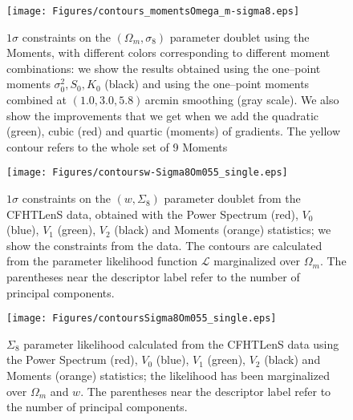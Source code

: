 \documentclass[reprint,aps,prd,superscriptaddress,showkeys,showpacs]{revtex4-1}
\begin{document}
\begin{figure}
\begin{center}
\texttt{[image: Figures/contours\_momentsOmega\_m-sigma8.eps]}
\end{center}
\caption{$1\sigma$ constraints on the $(\Omega_m,\sigma_8)$ parameter doublet using the Moments, with different colors corresponding to different moment combinations: we show the results obtained using the one--point moments $\sigma_0^2,S_0,K_0$ (black) and using the one--point moments combined at $(1.0,3.0,5.8)$\,arcmin smoothing (gray scale). We also show the improvements that we get when we add the quadratic (green), cubic (red) and quartic (moments) of gradients. The yellow contour refers to the whole set of 9 Moments}
\label{contoursMoments}
\end{figure}

\begin{figure}
\begin{center}
\texttt{[image: Figures/contoursw-Sigma8Om055\_single.eps]}
\end{center}
\caption{$1\sigma$ constraints on the $(w,\Sigma_8)$ parameter doublet from the CFHTLenS data, obtained with the Power Spectrum (red), $V_0$ (blue), $V_1$ (green), $V_2$ (black) and Moments (orange) statistics; we show the constraints from the data. The contours are calculated from the parameter likelihood function $\mathcal{L}$ marginalized over $\Omega_m$. The parentheses near the descriptor label refer to the number of principal components.}
\label{contours3singleRep}
\end{figure}

\begin{figure}
\begin{center}
\texttt{[image: Figures/contoursSigma8Om055\_single.eps]}
\end{center}
\caption{$\Sigma_8$ parameter likelihood calculated from the CFHTLenS data using the Power Spectrum (red), $V_0$ (blue), $V_1$ (green), $V_2$ (black) and Moments (orange) statistics; the likelihood has been marginalized over $\Omega_m$ and $w$. The parentheses near the descriptor label refer to the number of principal components.}
\label{likelihoodSi8single}
\end{figure}
\end{document}
